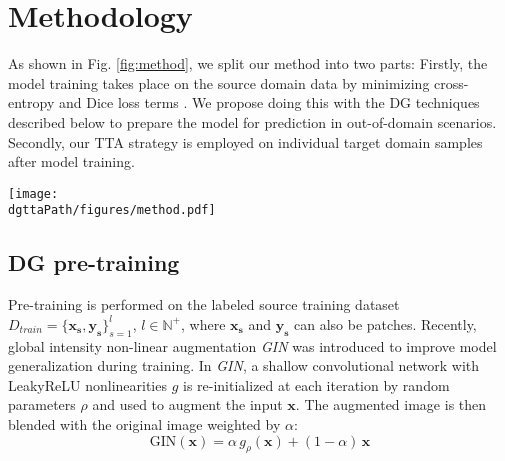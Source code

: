 



\section{Methodology}
    \label{sec:method_dgtta}
    As shown in Fig. \ref{fig:method}, we split our method into two parts: Firstly, the model training takes place on the source domain data by minimizing cross-entropy and Dice loss terms \cite{isensee2021nnu}. We propose doing this with the DG techniques described below to prepare the model for prediction in out-of-domain scenarios. Secondly, our TTA strategy is employed on individual target domain samples after model training.
    \begin{figure*}
        \centerline{\texttt{[image: \\dgttaPath/figures/method.pdf]}}
        \caption{Left: Model pre-training with source domain data. We propose to use \emph{GIN}, \emph{MIND} or their combination \emph{GIN+MIND} in this step. Right: \emph{DG-TTA} method applied in the target data domain. Two differently augmented versions of the same input are passed through the pre-trained segmentation network. The network weights are then optimized supervising the predictions with a Dice loss steering the network to produce consistent predictions.}
        \label{fig:method}
    \end{figure*}

    \subsection{DG pre-training}
    Pre-training is performed on the labeled source training dataset $D_{train}=\{\mathbf{x_s},\mathbf{y_s}\}_{s=1}^{l}$, $l\in\mathbb{N}^+$, where $\mathbf{x_s}$ and $\mathbf{y_s}$ can also be patches.
    Recently, global intensity non-linear augmentation \emph{GIN} \cite{ouyang2022causality} was introduced to improve model generalization during training.
    In \emph{GIN}, a shallow convolutional network with LeakyReLU nonlinearities $g$ is re-initialized at each iteration by random parameters $\rho$ and used to augment the input $\mathbf{x}$.
    The augmented image is then blended with the original image weighted by $\alpha$:
    \begin{equation}
        \text{GIN}(\mathbf{x}) = \alpha\,g_\rho(\mathbf{x}) + (1-\alpha)\,\mathbf{x}
    \end{equation}

